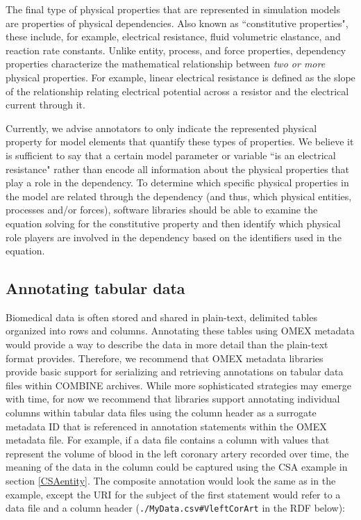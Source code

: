 \documentclass[pdftex,rgb,dvipsnames,svgnames,hyperref,table]{report}
\begin{document}
The final type of physical properties that are represented in simulation models are properties of physical dependencies. Also known as ``constitutive properties", these include, for example, electrical resistance, fluid volumetric elastance, and reaction rate constants. Unlike entity, process, and force properties, dependency properties characterize the mathematical relationship between \textit{two or more} physical properties. For example, linear electrical resistance is defined as the slope of the relationship relating electrical potential across a resistor and the electrical current through it.

Currently, we advise annotators to only indicate the represented physical property for model elements that quantify these types of properties. We believe it is sufficient to say that a certain model parameter or variable ``is an electrical resistance" rather than encode all information about the physical properties that play a role in the dependency. To determine which specific physical properties in the model are related through the dependency (and thus, which physical entities, processes and/or forces), software libraries should be able to examine the equation solving for the constitutive property and then identify which physical role players are involved in the dependency based on the identifiers used in the equation.

\subsection{Annotating tabular data}
Biomedical data is often stored and shared in plain-text, delimited tables organized into rows and columns. Annotating these tables using OMEX metadata would provide a way to describe the data in more detail than the plain-text format provides. Therefore, we recommend that OMEX metadata libraries provide basic support for serializing and retrieving annotations on tabular data files within COMBINE archives. While more sophisticated strategies may emerge with time, for now we recommend that libraries support annotating individual columns within tabular data files using the column header as a surrogate metadata ID that is referenced in annotation statements within the OMEX metadata file. For example, if a data file contains a column with values that represent the volume of blood in the left coronary artery recorded over time, the meaning of the data in the column could be captured using the CSA example in section \ref{CSAentity}. The composite annotation would look the same as in the example, except the URI for the subject of the first statement would refer to a data file and a column header (\texttt{./MyData.csv\#VleftCorArt} in the RDF below):
\end{document}
